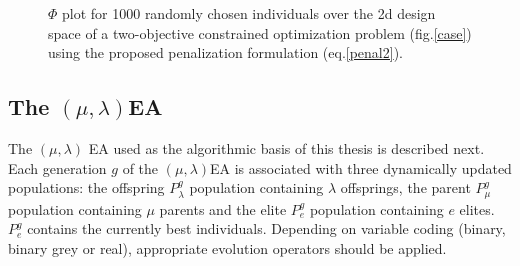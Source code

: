 \begin{figure}[h!]
\begin{minipage}[b]{1.0\linewidth}
 \centering
\end{minipage}
\caption{$\Phi$ plot for 1000 randomly chosen individuals over the 2d design space of a two-objective constrained optimization problem (fig.\ref{case}) using the proposed penalization formulation (eq.\ref{penal2}).}
\label{fit2}
\end{figure}
 
\subsection{The $(\mu,\lambda)$EA}

The $(\mu,\lambda)$ EA used as the algorithmic basis of this thesis is described next.
Each generation $g$ of the $(\mu,\lambda)$EA is associated with three dynamically updated populations: the offspring $P_{\lambda}^g$ population containing $\lambda$ offsprings, the parent $P_{\mu}^g$ population containing $\mu$ parents and the elite $P_{e}^g$ population containing $e$ elites. $P_{e}^g$ contains the currently best individuals. Depending on variable coding (binary, binary grey or real), appropriate evolution operators should be applied. 

